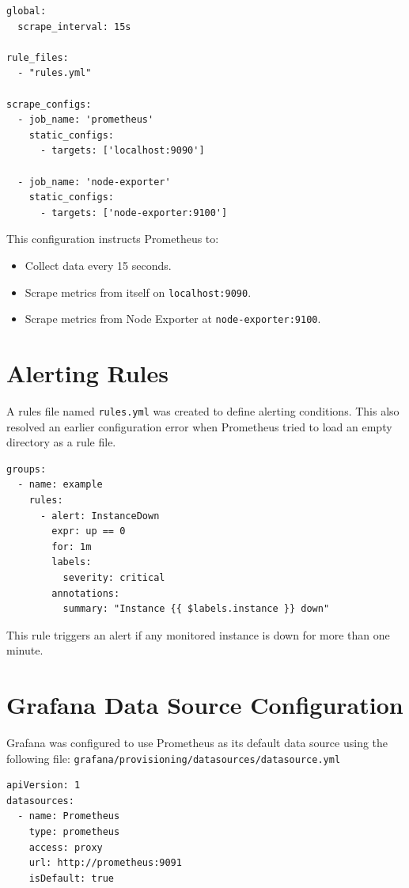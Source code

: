 \begin{verbatim}
global:
  scrape_interval: 15s

rule_files:
  - "rules.yml"

scrape_configs:
  - job_name: 'prometheus'
    static_configs:
      - targets: ['localhost:9090']

  - job_name: 'node-exporter'
    static_configs:
      - targets: ['node-exporter:9100']
\end{verbatim}

\noindent
This configuration instructs Prometheus to:
\begin{itemize}
    \item Collect data every 15 seconds.
    \item Scrape metrics from itself on \texttt{localhost:9090}.
    \item Scrape metrics from Node Exporter at \texttt{node-exporter:9100}.
\end{itemize}

\section{Alerting Rules}
A rules file named \texttt{rules.yml} was created to define alerting conditions. 
This also resolved an earlier configuration error when Prometheus tried to load an empty directory as a rule file.

\begin{verbatim}
groups:
  - name: example
    rules:
      - alert: InstanceDown
        expr: up == 0
        for: 1m
        labels:
          severity: critical
        annotations:
          summary: "Instance {{ $labels.instance }} down"
\end{verbatim}

\noindent
This rule triggers an alert if any monitored instance is down for more than one minute.

\section{Grafana Data Source Configuration}
Grafana was configured to use Prometheus as its default data source using the following file:  
\texttt{grafana/provisioning/datasources/datasource.yml}

\begin{verbatim}
apiVersion: 1
datasources:
  - name: Prometheus
    type: prometheus
    access: proxy
    url: http://prometheus:9091
    isDefault: true
\end{verbatim}

